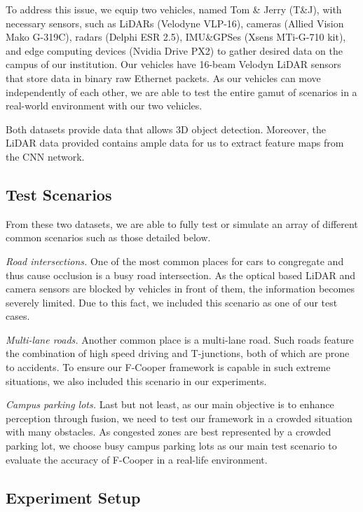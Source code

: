 \documentclass[sigconf]{acmart}
\begin{document}
To address this issue, we equip two vehicles, named Tom \& Jerry (T\&J), with necessary sensors, such as LiDARs (Velodyne VLP-16), cameras (Allied Vision Mako G-319C), radars (Delphi ESR 2.5), IMU\&GPSes (Xsens MTi-G-710 kit), and edge computing devices (Nvidia Drive PX2) to gather desired data on the campus of our institution. 
Our vehicles have 16-beam Velodyn LiDAR sensors that store  data in binary raw Ethernet packets. As our vehicles can move independently of each other, we are able to test the entire gamut of scenarios in a real-world environment with our two vehicles. 

Both datasets provide data that allows 3D object detection. Moreover, the LiDAR data provided contains ample data for us to extract feature maps from the CNN network.


\subsection{Test Scenarios}

From these two datasets, we are able to fully test or simulate an array of different common scenarios such as those detailed below.

\textit{Road intersections.}
One of the most common places for cars to congregate and thus cause occlusion is a busy road intersection. As the optical based LiDAR and camera sensors are blocked by  vehicles in front of them, the information becomes severely limited. Due to this fact, we included this scenario as one of our test cases.  



\textit{Multi-lane roads.}
Another common place  is a multi-lane road. Such roads feature the combination of high speed driving and T-junctions, both of which are prone to accidents. To ensure our F-Cooper framework is capable in such extreme situations, we also included this scenario in our experiments. 


\textit{Campus parking lots.}
Last but not least, as our main objective is to enhance perception through fusion, we need to test our framework in a crowded situation with many obstacles. As congested zones are best represented by a crowded parking lot, we choose busy campus parking lots as our main test scenario to evaluate the accuracy of F-Cooper in a real-life environment. 



\subsection{Experiment Setup}
\end{document}
